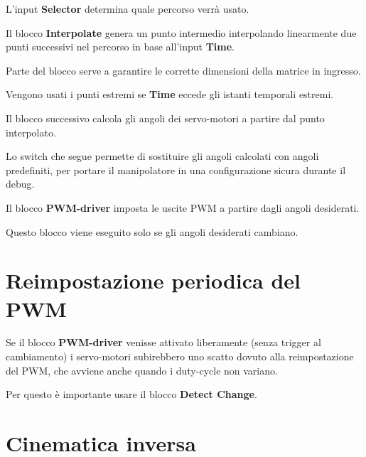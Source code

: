 \documentclass[12pt]{report}
\begin{document}
L'input \textbf{Selector} determina quale percorso verrà usato.

Il blocco \textbf{Interpolate} genera un punto intermedio interpolando linearmente due punti successivi nel percorso in base all'input \textbf{Time}.

Parte del blocco serve a garantire le corrette dimensioni della matrice in ingresso.

Vengono usati i punti estremi se \textbf{Time} eccede gli istanti temporali estremi.

Il blocco successivo calcola gli angoli dei servo-motori a partire dal punto interpolato.

Lo switch che segue permette di sostituire gli angoli calcolati con angoli predefiniti, per portare il manipolatore in una configurazione sicura durante il debug.

Il blocco \textbf{PWM-driver} imposta le uscite PWM a partire dagli angoli desiderati.

Questo blocco viene eseguito solo se gli angoli desiderati cambiano.

\section{Reimpostazione periodica del PWM}

Se il blocco \textbf{PWM-driver} venisse attivato liberamente (senza trigger al cambiamento) i servo-motori subirebbero uno scatto dovuto alla reimpostazione del PWM, che avviene anche quando i duty-cycle non variano.

Per questo è importante usare il blocco \textbf{Detect Change}. 

\section{Cinematica inversa}
\end{document}
